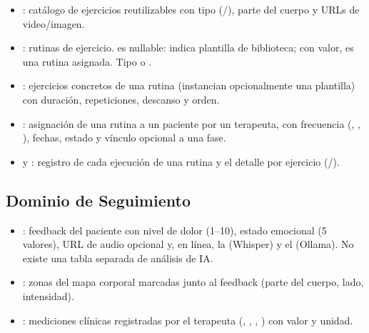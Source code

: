 \begin{itemize}
  \item {}: catálogo de ejercicios reutilizables con tipo (/), parte del cuerpo y URLs de video/imagen.

  \item {}: rutinas de ejercicio.  es nullable:  indica plantilla de biblioteca; con valor, es una rutina asignada. Tipo  o .

  \item {}: ejercicios concretos de una rutina (instancian opcionalmente una plantilla) con duración, repeticiones, descanso y orden.

  \item {}: asignación de una rutina a un paciente por un terapeuta, con frecuencia (, , ), fechas, estado y vínculo opcional a una fase.

  \item {} y : registro de cada ejecución de una rutina y el detalle por ejercicio (/).
\end{itemize}

\subsection{Dominio de Seguimiento}

\begin{itemize}
  \item {}: feedback del paciente con nivel de dolor (1--10), estado emocional (5 valores), URL de audio opcional y, en línea, la  (Whisper) y el  (Ollama). No existe una tabla separada de análisis de IA.

  \item {}: zonas del mapa corporal marcadas junto al feedback (parte del cuerpo, lado, intensidad).

  \item {}: mediciones clínicas registradas por el terapeuta (, , , ) con valor y unidad.
\end{itemize}

